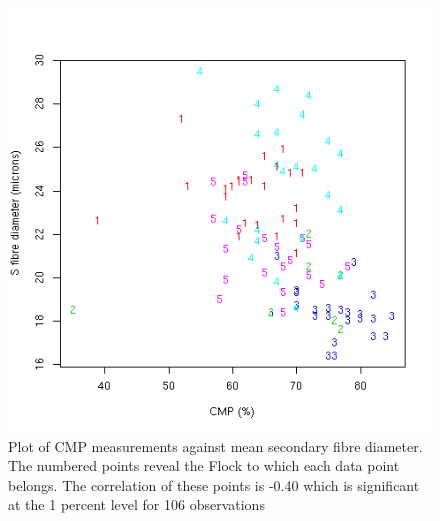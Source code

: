 %

\begin{figure}[!h]
  \centering
  \includegraphics[width=1.0\textwidth]{cmpds.png}
  \caption{Plot of CMP measurements against mean secondary fibre diameter. The numbered points reveal the Flock to which each data point belongs. The correlation of these points is -0.40 which is significant at the 1 percent level for 106 observations}
  \label{fig:cmpds}
\end{figure}

%

